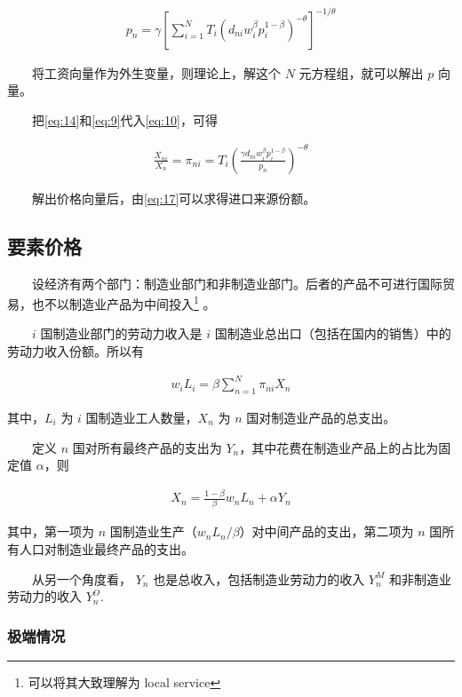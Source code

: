 \documentclass[]{article}
\let\rmarkdownfootnote\footnote%
\def\footnote{\protect\rmarkdownfootnote}
\begin{document}
\begin{align}
p_{n}=\gamma\left[\sum_{i=1}^{N} T_{i}\left(d_{n i} w_{i}^{\beta} p_{i}^{1-\beta}\right)^{-\theta}\right]^{-1 / \theta} \label{eq:16}
\end{align}

　　将工资向量作为外生变量，则理论上，解这个 \(N\) 元方程组，就可以解出 \(p\) 向量。

　　把\eqref{eq:14}和\eqref{eq:9}代入\eqref{eq:10}，可得

\begin{align}
\frac{X_{n i}}{X_{n}}=\pi_{n i}=T_{i}\left(\frac{\gamma d_{n i} w_{i}^{\beta} p_{i}^{1-\beta}}{p_{n}}\right)^{-\theta} \label{eq:17}
\end{align}

　　解出价格向量后，由\eqref{eq:17}可以求得进口来源份额。

\hypertarget{section-18}{%
\subsection{要素价格}\label{section-18}}

　　设经济有两个部门：制造业部门和非制造业部门。后者的产品不可进行国际贸易，也不以制造业产品为中间投入\footnote{可以将其大致理解为 local service} 。

　　\(i\) 国制造业部门的劳动力收入是 \(i\) 国制造业总出口（包括在国内的销售）中的劳动力收入份额。所以有

\begin{align}
w_{i} L_{i}=\beta \sum_{n=1}^{N} \pi_{n i} X_{n} \label{eq:18}
\end{align}

其中，\(L_i\) 为 \(i\) 国制造业工人数量，\(X_n\) 为 \(n\) 国对制造业产品的总支出。

　　定义 \(n\) 国对所有最终产品的支出为 \(Y_n\)，其中花费在制造业产品上的占比为固定值 \(\alpha\)，则

\begin{align}
X_{n}=\frac{1-\beta}{\beta} w_{n} L_{n}+\alpha Y_{n} \label{eq:19}
\end{align}

其中，第一项为 \(n\) 国制造业生产（\(w_{n}L_{n}/\beta\)）对中间产品的支出，第二项为 \(n\) 国所有人口对制造业最终产品的支出。

　　从另一个角度看， \(Y_n\) 也是总收入，包括制造业劳动力的收入 \(Y_n^M\) 和非制造业劳动力的收入 \(Y_n^O\).

\hypertarget{section-19}{%
\subsubsection{极端情况}\label{section-19}}
\end{document}
